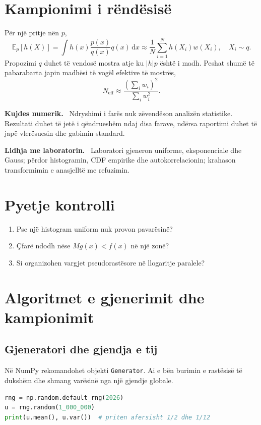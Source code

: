 \documentclass[11pt,oneside,openany]{book}
\newcommand{\E}{\mathbb{E}}
\newcommand{\dd}{\,\mathrm{d}}
\newenvironment{kujdes}{\par\medskip\noindent\textbf{Kujdes numerik.}\ }{\par\medskip}
\newenvironment{lidhje}{\par\medskip\noindent\textbf{Lidhja me laboratorin.}\ }{\par\medskip}
\begin{document}
\section{Kampionimi i rëndësisë}
Për një pritje nën $p$,
\begin{equation}
 \E_p[h(X)]=\int h(x)\frac{p(x)}{q(x)}q(x)\dd x
 \approx\frac1N\sum_{i=1}^Nh(X_i)w(X_i),\quad X_i\sim q.
\end{equation}
Propozimi $q$ duhet të vendosë mostra atje ku $|h|p$ është i madh. Peshat shumë të pabarabarta japin madhësi të vogël efektive të mostrës,
\begin{equation}
 N_{\mathrm{eff}}\approx\frac{(\sum_iw_i)^2}{\sum_iw_i^2}.
\end{equation}

\begin{kujdes}
Ndryshimi i farës nuk zëvendëson analizën statistike. Rezultati duhet të jetë i qëndrueshëm ndaj disa farave, ndërsa raportimi duhet të japë vlerësuesin dhe gabimin standard.
\end{kujdes}

\begin{lidhje}
Laboratori gjeneron uniforme, eksponenciale dhe Gauss; përdor histogramin, CDF empirike dhe autokorrelacionin; krahason transformimin e anasjelltë me refuzimin.
\end{lidhje}

\section*{Pyetje kontrolli}
\begin{enumerate}
\item Pse një histogram uniform nuk provon pavarësinë?
\item Çfarë ndodh nëse $Mg(x)<f(x)$ në një zonë?
\item Si organizohen vargjet pseudorastësore në llogaritje paralele?
\end{enumerate}

\section{Algoritmet e gjenerimit dhe kampionimit}
\subsection{Gjeneratori dhe gjendja e tij}
Në NumPy rekomandohet objekti \texttt{Generator}. Ai e bën burimin e rastësisë të dukshëm dhe shmang varësinë nga një gjendje globale.
\begin{lstlisting}[language=Python]
rng = np.random.default_rng(2026)
u = rng.random(1_000_000)
print(u.mean(), u.var())  # priten afersisht 1/2 dhe 1/12
\end{lstlisting}
\end{document}
